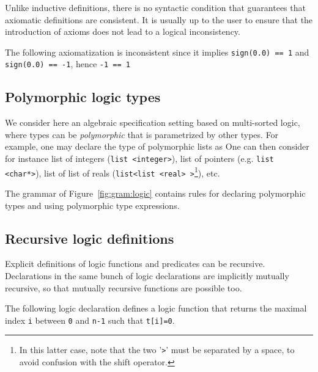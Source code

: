 Unlike inductive definitions, there is no syntactic condition that
 guarantees that axiomatic definitions are consistent. It is usually
up to the user to ensure that the introduction of axioms does not lead
to a logical inconsistency.

\begin{example}
  The following axiomatization
  is inconsistent since
  it implies \lstinline|sign(0.0) == 1| and \lstinline|sign(0.0) == -1|,
  hence \lstinline|-1 == 1|
\end{example}

\subsection{Polymorphic logic types}\label{sec:polym-logic-types}

We consider here an algebraic specification setting based on
multi-sorted logic, where types can be \emph{polymorphic} that is
parametrized by other types. For example, one may declare the type of
polymorphic lists as
One can then consider for
instance list of integers (\lstinline|list <integer>|), list of pointers
(e.g. \lstinline|list <char*>|), list of list of reals
(\lstinline|list<list <real> >|\footnote{In this latter case, note that the two
  '\texttt{>}' must be separated by a space, to avoid confusion with
  the shift operator.}), etc.

The grammar of Figure~\ref{fig:gram:logic} contains rules for
declaring polymorphic types and using polymorphic type
expressions.


\subsection{Recursive logic definitions}
Explicit definitions of logic functions and predicates can be
recursive. Declarations in the same bunch of logic declarations are
implicitly mutually recursive, so that mutually recursive functions are
possible too.

\begin{example}
  The following logic declaration
  defines a logic function that returns the maximal index \lstinline|i| between
  \lstinline|0| and \lstinline|n-1| such that \lstinline|t[i]=0|.
\end{example}

